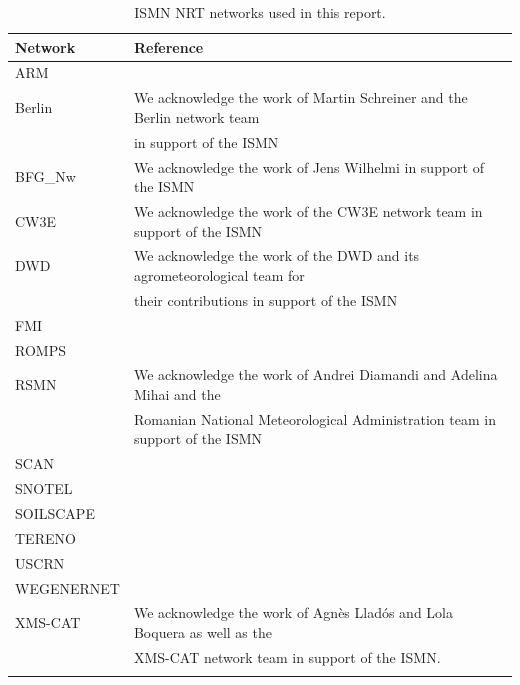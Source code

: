 \begin{table}[htb]
\centering
\small
\begin{tabular}{@{}ll@{}}
\toprule
Network     & Reference \\ \midrule
ARM         & \cite{Cook2016a,Cook2016b,Cook2018} \\
Berlin      & We acknowledge the work of Martin Schreiner and the Berlin network team \\
            & in support of the ISMN \\
BFG\_Nw     & We acknowledge the work of Jens Wilhelmi in support of the ISMN \\
CW3E        & We acknowledge the work of the CW3E network team in support of the ISMN \\  %
DWD         & We acknowledge the work of the DWD and its agrometeorological team for \\
            & their contributions in support of the ISMN \\
FMI         & \cite{Ikonen2016,Ikonen2018} \\
ROMPS       & \cite{Zech2020} \\
RSMN        & We acknowledge the work of Andrei Diamandi and Adelina Mihai and the \\
            & Romanian National Meteorological Administration team in support of the ISMN \\
SCAN        & \cite{Schaefer2007} \\
SNOTEL      & \cite{Leavesley2008} \\
SOILSCAPE   & \cite{Shuman2010,Moghaddam2011,Moghaddam2016} \\
TERENO      & \cite{Bogena2012,Bogena2016,Bogena2018} \\
USCRN       & \cite{Bell2013} \\
WEGENERNET  & \cite{Kirchengast2014,Fuchsberger2021} \\
XMS-CAT     & We acknowledge the work of Agnès Lladós and Lola Boquera as well as the \\
            & XMS-CAT network team in support of the ISMN. \\
            &           \\ \bottomrule
\end{tabular}
\caption{\ac{ISMN} \ac{NRT} networks used in this report.}
\label{tab:ismn_refs}
\end{table}

